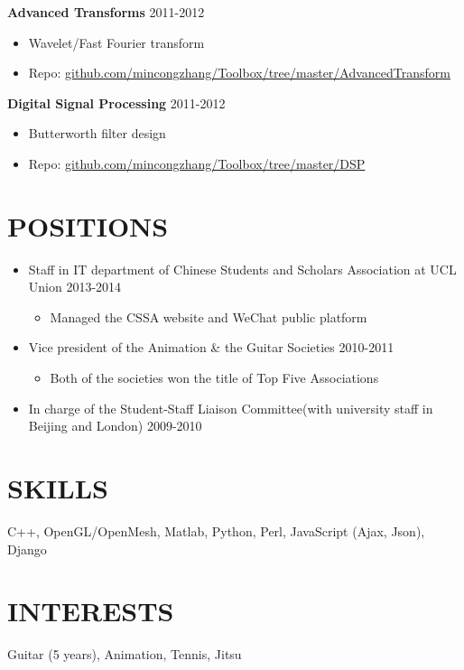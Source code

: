 \documentclass[line,margin]{res}
\begin{document}
\begin{resume}
{\bf Advanced Transforms}
\hfill{\textcolor[rgb]{0.7,0.7,0.7}{2011-2012}}
\begin{itemize}\itemsep -2pt %
    \item Wavelet/Fast Fourier transform
    \item Repo: \href{https://github.com/mincongzhang/Toolbox/tree/master/AdvancedTransform}{github.com/mincongzhang/Toolbox/tree/master/AdvancedTransform}
\end{itemize}

{\bf Digital Signal Processing}
\hfill{\textcolor[rgb]{0.7,0.7,0.7}{2011-2012}}
\begin{itemize}\itemsep -2pt %
    \item Butterworth filter design
    \item Repo: \href{https://github.com/mincongzhang/Toolbox/tree/master/DSP}{github.com/mincongzhang/Toolbox/tree/master/DSP}
\end{itemize}

\renewcommand{\labelitemi}{$\bullet$}
\renewcommand{\labelitemii}{-}

\section{POSITIONS}
\begin{itemize}\itemsep -2pt %

    \item Staff in IT department of Chinese Students and Scholars Association at UCL Union \hfill{\textcolor[rgb]{0.7,0.7,0.7}{2013-2014}}\vspace{-6pt}
    \begin{itemize}\itemsep -2pt %
    \item Managed the CSSA website and WeChat public platform
    \end{itemize}
    
    \item Vice president of the Animation \& the Guitar Societies \hfill{\textcolor[rgb]{0.7,0.7,0.7}{2010-2011}}\vspace{-6pt}
    \begin{itemize}\itemsep -2pt %
    \item Both of the societies won the title of Top Five Associations
    \end{itemize}
    \item In charge of the Student-Staff Liaison Committee(with university staff in Beijing and London)
    \hfill{\textcolor[rgb]{0.7,0.7,0.7}{2009-2010}}
\end{itemize}


\section{SKILLS}
C++, OpenGL/OpenMesh, Matlab, Python, Perl, JavaScript (Ajax, Json), Django

\section{INTERESTS}
Guitar (5 years), Animation, Tennis, Jitsu
\end{resume}
\end{document}
